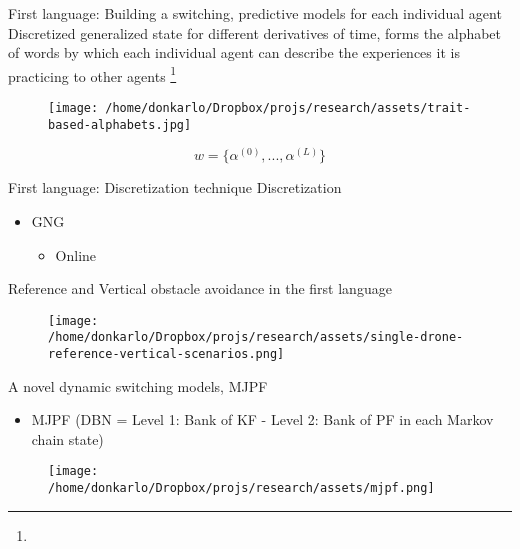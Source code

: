 \documentclass[unknownkeysallowed]{beamer}
\begin{document}
	\begin{frame}{First language: Building a switching, predictive models for each individual agent}
		Discretized generalized state for different derivatives of time, forms the alphabet of words by which each individual agent can describe the experiences it is practicing to other agents \footnote{}
		\begin{figure}
			\texttt{[image: /home/donkarlo/Dropbox/projs/research/assets/trait-based-alphabets.jpg]}
			\caption{}
		\end{figure}
		\begin{equation}
		w = \{\alpha^{(0)},...,\alpha^{(L)}\}
		\end{equation}
	\end{frame}

	\begin{frame}{First language: Discretization technique}
		Discretization
		\begin{itemize}
			\item GNG 
			\begin{itemize}
				\item Online
			\end{itemize}
		\end{itemize}
	\end{frame}

	\begin{frame}{Reference and Vertical obstacle avoidance in the first language}
		\begin{figure}
			\texttt{[image: /home/donkarlo/Dropbox/projs/research/assets/single-drone-reference-vertical-scenarios.png]}
		\end{figure}
	\end{frame}

	\begin{frame}{A novel dynamic switching models, MJPF}
		\begin{itemize}
			\item MJPF (DBN = Level 1: Bank of KF - Level 2: Bank of PF in each Markov chain state)
		\end{itemize}
		\begin{figure}
			\texttt{[image: /home/donkarlo/Dropbox/projs/research/assets/mjpf.png]}
		\end{figure}
	\end{frame}
\end{document}
